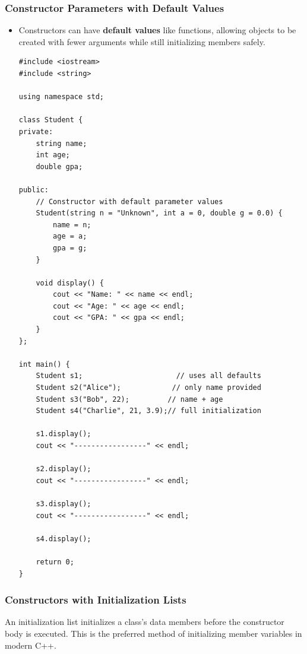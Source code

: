 \documentclass[10pt]{article}
\begin{document}
\newpage
\subsubsection{Constructor Parameters with Default Values}
\begin{itemize}
	\item Constructors can have \textbf{default values} like functions, allowing objects to be created with fewer arguments while still initializing members safely.

	\begin{verbatim}
#include <iostream>
#include <string>

using namespace std;

class Student {
private:
    string name;
    int age;
    double gpa;

public:
    // Constructor with default parameter values
    Student(string n = "Unknown", int a = 0, double g = 0.0) {
        name = n;
        age = a;
        gpa = g;
    }

    void display() {
        cout << "Name: " << name << endl;
        cout << "Age: " << age << endl;
        cout << "GPA: " << gpa << endl;
    }
};

int main() {
    Student s1;                      // uses all defaults
    Student s2("Alice");            // only name provided
    Student s3("Bob", 22);         // name + age
    Student s4("Charlie", 21, 3.9);// full initialization

    s1.display();
    cout << "-----------------" << endl;

    s2.display();
    cout << "-----------------" << endl;

    s3.display();
    cout << "-----------------" << endl;

    s4.display();

    return 0;
}
	\end{verbatim}
\end{itemize}

\newpage
\subsubsection{Constructors with Initialization Lists}

An initialization list initializes a class's data members before the constructor body is executed. This is the preferred method of initializing member variables in modern C++.
\end{document}
